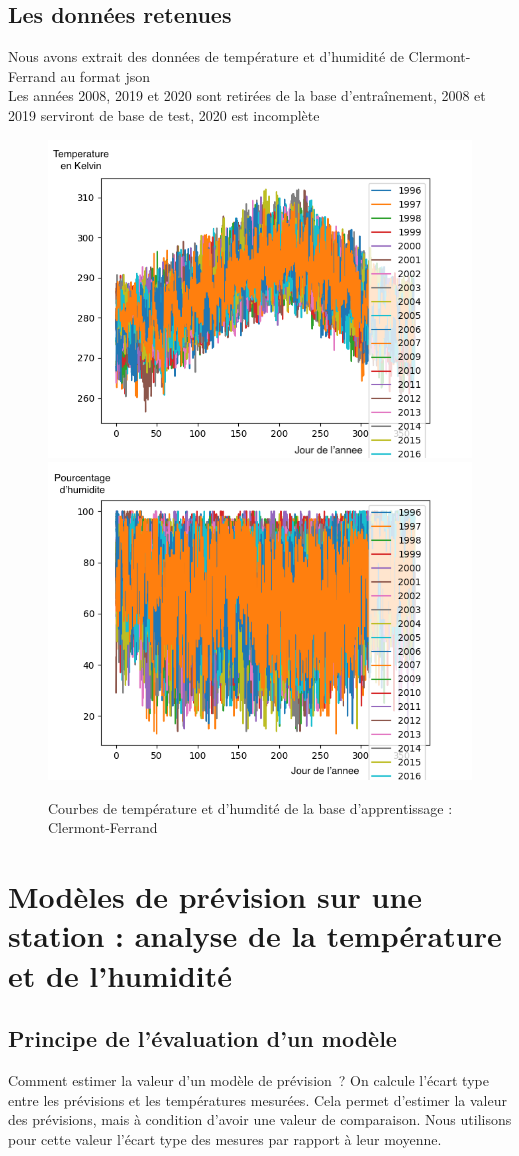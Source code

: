 \documentclass[11pt,a4paper]{article}
\begin{document}
\subsection{Les données retenues}
Nous avons extrait des données de température et d'humidité de Clermont-Ferrand au format json \\
Les années 2008, 2019 et 2020 sont retirées de la base d'entraînement, 2008 et 2019 serviront de base de test, 2020 est incomplète\\
\begin{figure} [!h]
\centering
\includegraphics[width=0.48 \textwidth]{./imagesTIPE/temperature.png}\quad
\includegraphics[width=0.48 \textwidth]{./imagesTIPE/humidite.png}
\caption{\label{fig:190101Lolita} Courbes de température et d'humdité de la base d'apprentissage : Clermont-Ferrand}
\end{figure}
\section{Modèles de prévision sur une station : analyse de la température et de l'humidité}
\subsection{Principe de l'évaluation d'un modèle}
Comment estimer la valeur d'un modèle de prévision~? On calcule l'écart type entre les prévisions et les températures mesurées. Cela permet d'estimer la valeur des prévisions, mais à condition d'avoir une valeur de comparaison. Nous utilisons pour cette valeur l'écart type des mesures par rapport à leur moyenne.
\end{document}
